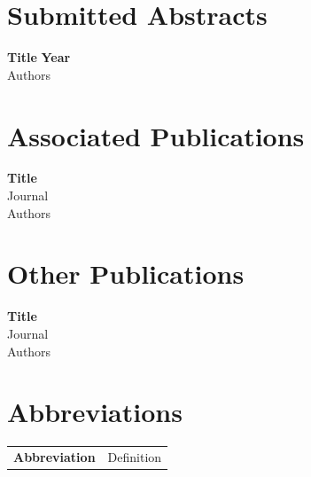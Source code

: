 \newpage
\chapter*{Submitted Abstracts}
\thispagestyle{plain} %
\noindent

\noindent
\textbf{Title}
\hfill \textbf{Year}\\
Authors\\

\newpage
\chapter*{Associated Publications}
\thispagestyle{plain} %
\noindent
\textbf{Title}\\
Journal\\
Authors\\

\begingroup
\let\clearpage\relax
\chapter*{Other Publications}
\noindent
\textbf{Title}\\
Journal\\
Authors\\

\endgroup


\newpage
{}
\tableofcontents

\newpage
\listoffigures
{}

\newpage
\listoftables
{}



\chapter*{Abbreviations}

\begin{table}[H]
\singlespacing
  \centering
   \begin{tabular}{@{}m{2.5cm}m{10cm}@{}}
	  \textbf{Abbreviation} & Definition \\
    \end{tabular}%
\end{table}%
%
